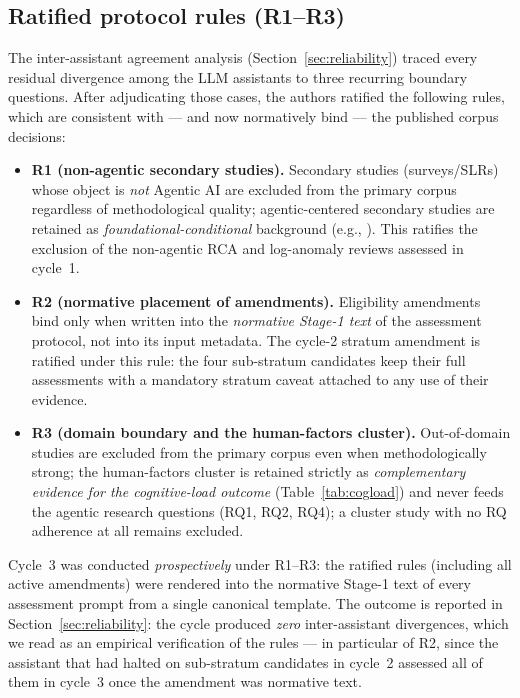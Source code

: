 \documentclass{ieeeaccess}
\begin{document}
\subsection{Ratified protocol rules (R1--R3)}
\label{sec:rules}

The inter-assistant agreement analysis (Section~\ref{sec:reliability}) traced every
residual divergence among the LLM assistants to three recurring
boundary questions. After adjudicating those cases, the authors
ratified the following rules,
which are consistent with --- and now normatively bind --- the published
corpus decisions:

\begin{itemize}
  \item \textbf{R1 (non-agentic secondary studies).} Secondary studies
        (surveys/SLRs) whose object is \emph{not} Agentic AI are
        excluded from the primary corpus regardless of methodological
        quality; agentic-centered secondary studies are retained as
        \emph{foundational-conditional} background
        (e.g., \cite{P24,P33,P52,P54,P79}). This ratifies the exclusion
        of the non-agentic RCA and log-anomaly reviews assessed in
        cycle~1.
  \item \textbf{R2 (normative placement of amendments).} Eligibility
        amendments bind only when written into the \emph{normative
        Stage-1 text} of the assessment protocol, not into its input
        metadata. The cycle-2 stratum amendment is ratified under this
        rule: the four sub-stratum candidates keep their full
        assessments with a mandatory stratum caveat attached to any use
        of their evidence.
  \item \textbf{R3 (domain boundary and the human-factors cluster).}
        Out-of-domain studies are excluded from the primary corpus even
        when methodologically strong; the human-factors cluster
        \cite{P62,P63,P69,P81} is retained strictly as
        \emph{complementary evidence for the cognitive-load outcome}
        (Table~\ref{tab:cogload}) and never feeds the agentic research
        questions (RQ1, RQ2, RQ4); a cluster study with no RQ adherence
        at all remains excluded.
\end{itemize}

Cycle~3 was conducted \emph{prospectively} under R1--R3: the ratified
rules (including all active amendments) were rendered into the normative
Stage-1 text of every assessment prompt from a single canonical
template. The outcome is reported in Section~\ref{sec:reliability}: the
cycle produced \emph{zero} inter-assistant divergences, which we read as an
empirical verification of the rules --- in particular of R2, since the
assistant that had halted on sub-stratum candidates in cycle~2 assessed
all of them in cycle~3 once the amendment was normative text.
\end{document}
